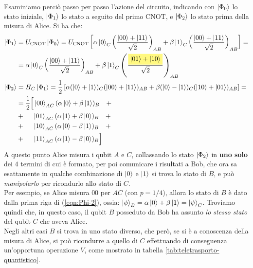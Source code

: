 \documentclass[../../InformazioneQuantistica.tex]{subfiles}
\begin{document}
Esaminiamo perciò passo per passo l'azione del circuito, indicando con $\Ket{\Phi_0}$ lo stato iniziale, $\Ket{\Phi_1}$ lo stato a seguito del primo CNOT, e $\Ket{\Phi_2}$ lo stato prima della misura di Alice. Si ha che:
\begin{align} \nonumber
\ket{\Phi_1} &= U_{\op{CNOT}} \ket{\Phi_0} = U_{\op{CNOT}}\left[\alpha\ket{0}_C\left(\frac{\ket{00}+\ket{11}}{\sqrt{2}}\right) _{AB}+ \beta\ket{1}_C \left(\frac{\ket{00}+\ket{11}}{\sqrt{2}}\right)_{AB}\right] =\\ \label{eqn:Phi-1}
&= \alpha\ket{0}_C \left(\frac{\ket{00}+\ket{11}}{\sqrt{2}}\right)_{AB} + \beta\ket{1}_C \left(\frac{\hlc{Yellow}{\ket{01}+\ket{10}}}{\sqrt{2}}\right)_{AB}\\
\nonumber \ket{\Phi_2} &=H_C \ket{\Phi_1} = \frac{1}{2}\left[\alpha (\ket{0} + \ket{1})_C (\ket{00}+\ket{11})_{AB} + \beta(\ket{0}-\ket{1})_{C}(\ket{10}+\ket{01})_{AB}\right] =\\ \nonumber
&=\frac{1}{2}\Big[\ket{00}_{AC} (\alpha\ket{0}+\beta\ket{1})_B \quad+\\ \nonumber
&+\quad\>\,  \ket{01}_{AC}(\alpha\ket{1} + \beta\ket{0})_B \quad+\\ \nonumber
&+\quad\>\,
\ket{10}_{AC} (\alpha\ket{0} - \beta\ket{1})_{B} \quad+\\
&+\quad\>\,
\ket{11}_{AC}(\alpha\ket{1}-\beta\ket{0})_B \Big]
\label{eqn:Phi-2}
\end{align}
A questo punto Alice misura i qubit $A$ e $C$, collassando lo stato $\Ket{\Phi_2}$ in \textbf{uno solo} dei $4$ termini di cui è formato, per poi comunicare i risultati a Bob, che ora sa esattamente in qualche combinazione di $\Ket{0}$ e $\Ket{1}$ si trova lo stato di $B$, e può \textit{manipolarlo} per ricondurlo allo stato di $C$.\\

Per esempio, se Alice misura $00$ per $AC$ (con $p=1/4$), allora lo stato di $B$ è dato dalla prima riga di (\ref{eqn:Phi-2}), ossia: $\Ket{\phi}_B = \alpha\Ket{0}+\beta\Ket{1}=\Ket{\psi}_C$. Troviamo quindi che, in questo caso, il qubit $B$ posseduto da Bob ha assunto \textit{lo stesso stato} del qubit $C$ che aveva Alice.\\

Negli altri casi $B$ si trova in uno stato diverso, che però, se si è a conoscenza della misura di Alice, si può ricondurre a quello di $C$ effettuando di conseguenza un'opportuna operazione $V$, come mostrato in tabella \ref{tab:teletrasporto-quantistico}.
\end{document}
